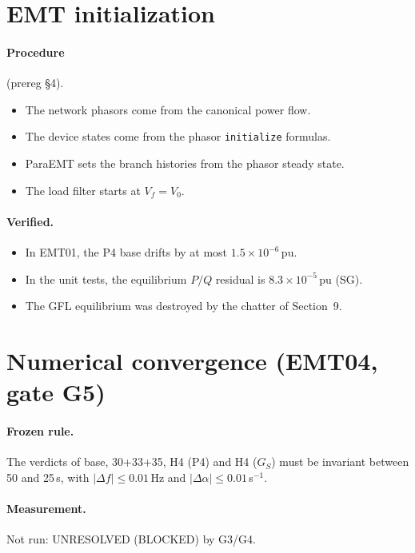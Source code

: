 \documentclass[10pt,a4paper]{article}
\newcommand{\us}{\,\textmu s}
\newcommand{\sinv}{\,s$^{-1}$}
\newcommand{\blocked}{\textsf{UNRESOLVED (BLOCKED)}}
\begin{document}
\section{EMT initialization}

\paragraph{Procedure} (prereg \S4).
\begin{itemize}
\item The network phasors come from the canonical power flow.
\item The device states come from the phasor \texttt{initialize} formulas.
\item ParaEMT sets the branch histories from the phasor steady state.
\item The load filter starts at $V_f=V_0$.
\end{itemize}

\paragraph{Verified.}
\begin{itemize}
\item In EMT01, the P4 base drifts by at most $1.5\times10^{-6}$\,pu.
\item In the unit tests, the equilibrium $P/Q$ residual is
  $8.3\times10^{-5}$\,pu (SG).
\item The GFL equilibrium was destroyed by the chatter of Section~9.
\end{itemize}

\section{Numerical convergence (EMT04, gate G5)}

\paragraph{Frozen rule.} The verdicts of base, 30+33+35, H4 (P4) and H4
($G_S$) must be invariant between 50 and 25\us, with $|\Delta f|\le0.01$\,Hz
and $|\Delta\alpha|\le0.01$\sinv.

\paragraph{Measurement.} Not run: \blocked{} by G3/G4.
\end{document}
